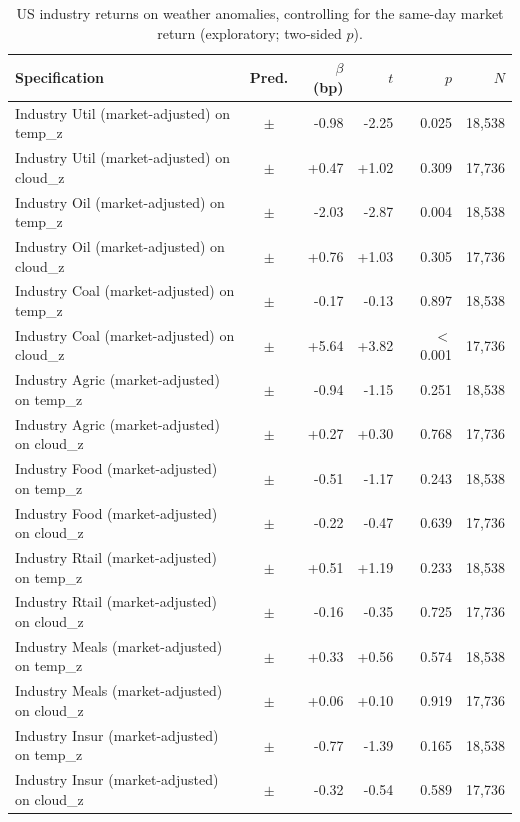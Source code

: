 \begin{table}[htbp]\centering\footnotesize
\caption{US industry returns on weather anomalies, controlling for the same-day market return (exploratory; two-sided $p$).}
\label{tab:robust_industry}
\begin{tabular}{lcrrrr}\toprule
Specification & Pred. & $\beta$ (bp) & $t$ & $p$ & $N$ \\ \midrule
Industry Util (market-adjusted) on temp\_z & $\pm$ & -0.98 & -2.25 & 0.025 & 18,538 \\
Industry Util (market-adjusted) on cloud\_z & $\pm$ & +0.47 & +1.02 & 0.309 & 17,736 \\
Industry Oil (market-adjusted) on temp\_z & $\pm$ & -2.03 & -2.87 & 0.004 & 18,538 \\
Industry Oil (market-adjusted) on cloud\_z & $\pm$ & +0.76 & +1.03 & 0.305 & 17,736 \\
Industry Coal (market-adjusted) on temp\_z & $\pm$ & -0.17 & -0.13 & 0.897 & 18,538 \\
Industry Coal (market-adjusted) on cloud\_z & $\pm$ & +5.64 & +3.82 & $<$0.001 & 17,736 \\
Industry Agric (market-adjusted) on temp\_z & $\pm$ & -0.94 & -1.15 & 0.251 & 18,538 \\
Industry Agric (market-adjusted) on cloud\_z & $\pm$ & +0.27 & +0.30 & 0.768 & 17,736 \\
Industry Food (market-adjusted) on temp\_z & $\pm$ & -0.51 & -1.17 & 0.243 & 18,538 \\
Industry Food (market-adjusted) on cloud\_z & $\pm$ & -0.22 & -0.47 & 0.639 & 17,736 \\
Industry Rtail (market-adjusted) on temp\_z & $\pm$ & +0.51 & +1.19 & 0.233 & 18,538 \\
Industry Rtail (market-adjusted) on cloud\_z & $\pm$ & -0.16 & -0.35 & 0.725 & 17,736 \\
Industry Meals (market-adjusted) on temp\_z & $\pm$ & +0.33 & +0.56 & 0.574 & 18,538 \\
Industry Meals (market-adjusted) on cloud\_z & $\pm$ & +0.06 & +0.10 & 0.919 & 17,736 \\
Industry Insur (market-adjusted) on temp\_z & $\pm$ & -0.77 & -1.39 & 0.165 & 18,538 \\
Industry Insur (market-adjusted) on cloud\_z & $\pm$ & -0.32 & -0.54 & 0.589 & 17,736 \\
\bottomrule\end{tabular}\end{table}
